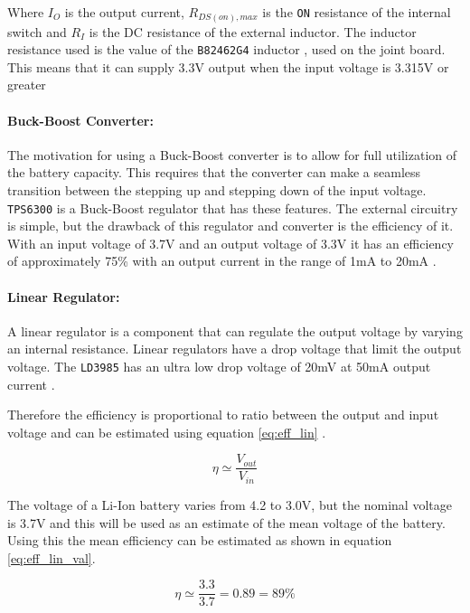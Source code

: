 Where $I_O$ is the output current, $R_{DS(on),max}$ is the \texttt{ON} resistance of the internal switch and $R_I$ is the DC resistance of the external inductor.
The inductor resistance used is the value of the \texttt{B82462G4} inductor \cite{B82462G4}, used on the joint board.
This means that it can supply 3.3V output when the input voltage is 3.315V or greater



\paragraph{Buck-Boost Converter:}
The motivation for using a Buck-Boost converter is to allow for full utilization of the battery capacity.
This requires that the converter can make a seamless transition between the stepping up and stepping down of the input voltage. 
\texttt{TPS6300} is a Buck-Boost regulator that has these features.
The external circuitry is simple, but the drawback of this regulator and converter is the efficiency of it.
With an input voltage of 3.7V and an output voltage of 3.3V it has an efficiency of approximately 75\% with an output current in the range of 1mA to 20mA \cite{TPS6300}.

\paragraph{Linear Regulator:}
A linear regulator is a component that can regulate the output voltage by varying an internal resistance.
Linear regulators have a drop voltage that limit the output voltage. 
The \texttt{LD3985} has an ultra low drop voltage of 20mV at 50mA output current \cite{LD3985}.

Therefore the efficiency is proportional to ratio between the output and input voltage and can be estimated using equation \ref{eq:eff_lin} \cite{ap_note_140}.

\begin{equation}
	\eta \simeq \frac{V_{out}}{V_{in}}
	\label{eq:eff_lin}
\end{equation}

The voltage of a Li-Ion battery varies from 4.2 to 3.0V, but the nominal voltage is 3.7V and this will be used as an estimate of the mean voltage of the battery.
Using this the mean efficiency can be estimated as shown in equation \ref{eq:eff_lin_val}.

\begin{equation}
	\eta \simeq \frac{3.3}{3.7} = 0.89 = 89\%
	\label{eq:eff_lin_val}
\end{equation}


